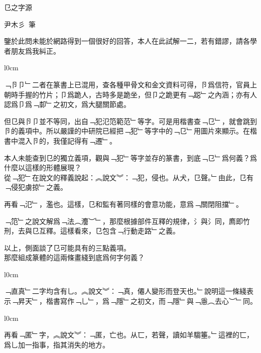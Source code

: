 \documentclass[a4paper]{article}
\begin{document}
\begin{Huge}
㔾之字源

尹木彡\ 筆
\\

\end{Huge}
\begin{huge}
鑒於此問未能於網路得到一個很好的回答，本人在此試解一二，若有錯謬，請各學者朋友爲我糾正。
\\
\begin{wrapfigure}{l}{0cm}
\end{wrapfigure}
﹁卪卩﹂二者在篆書上已混用，查各種甲骨文和金文資料可得，卪爲信符，官員上朝時手握的竹片；卩爲跪人，古時多是跪坐，但卩之跪更有﹁跽﹂之內涵；亦有人認爲卩爲﹁厀﹂之初文，爲大腿關節處。


但㔾與卪卩並不等同，出自﹁犯氾笵範范﹂等字。可是用楷書查﹁㔾﹂，就會跳到卪的義項中。所以嚴謹的中研院已經把﹁犯﹂等字中的﹁㔾﹂用圖片來顯示。在楷書中混入卪的，我僅記得有﹁遷﹂。

本人未能查到㔾的獨立義項，觀與﹁犯﹂等字並存的篆書，到底﹁㔾﹂爲何義？爲什麼以這樣的形體展現？
\\

從﹁犯﹂在說文的釋義說起：︽說文︾：﹁犯，侵也。从犬，㔾聲。﹂由此，㔾有﹁侵犯虜掠﹂之義。

再看﹁氾﹂，濫也。這樣，㔾和監有著同樣的會意功能，意爲﹁關閉阻擋﹂。

﹁笵﹂之說文解爲﹁法︵灋︶﹂，那麼根據部件互釋的規律，氵與氵同，廌即竹刑，去與㔾互釋。這樣看來，㔾包含﹁行動走路﹂之義。

以上，側面談了㔾可能具有的三點義項。
\\

那麼組成篆體的這兩條畫綫到底爲何字何義？

\begin{wrapfigure}{l}{0cm}
\end{wrapfigure}
﹁直真﹂二字均含有乚。︽說文︾：﹁真，僊人變形而登天也。﹂說明這一條綫表示﹁昇天﹂，楷書寫作﹁乚﹂，爲﹁隱﹂之初文，而﹁隱﹂與﹁㥯︵去心︶﹂同。

\begin{wrapfigure}{l}{0cm}
\end{wrapfigure}
再看﹁匿﹂字，︽說文︾：﹁匿，亡也。从匸，若聲，讀如羊騶箠。﹂這裡的匸，爲乚加一指事，指其消失的地方。


\end{huge}
\end{document}
